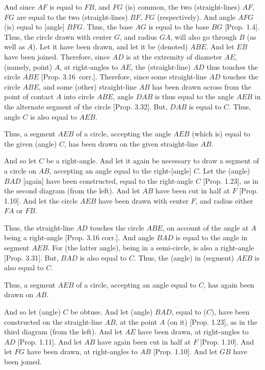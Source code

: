\begin{Parallel}{}{}
{And since $AF$ is equal to $FB$, and $FG$ (is) common, the two (straight-lines)
$AF$, $FG$ are equal to the two (straight-lines) $BF$, $FG$ (respectively). And
angle $AFG$ (is) equal to [angle] $BFG$. Thus, the base $AG$ is equal to the
base $BG$ [Prop. 1.4]. Thus, the circle drawn with center $G$, and radius $GA$, will also go through $B$ (as well as $A$). Let it have been drawn, and let it be (denoted) $ABE$. And let $EB$ have been joined. Therefore, since $AD$ is at the extremity
of diameter $AE$,  (namely, point) $A$,  at right-angles to $AE$, the (straight-line)
$AD$ thus touches the circle $ABE$ [Prop. 3.16~corr.]. Therefore,
since some straight-line $AD$ touches the circle $ABE$, and some (other)
straight-line $AB$ has been drawn across from the point of contact $A$ into circle
$ABE$, angle $DAB$ is thus equal to the angle $AEB$ in the alternate segment of the
circle [Prop. 3.32]. But, $DAB$ is equal to $C$. Thus,
angle $C$ is also equal to $AEB$.

Thus, a segment $AEB$ of a circle, accepting the angle $AEB$ (which is) equal to the
given (angle) $C$, has been drawn on the given straight-line $AB$.

And so let $C$ be a right-angle. And let it again be necessary to draw  a segment
of a circle on $AB$, accepting an angle equal to the right-[angle] $C$. Let the (angle)
$BAD$ [again] have been constructed, equal to the right-angle $C$ [Prop. 1.23], as in the second diagram (from the left). And let $AB$ have
been cut in half at $F$ [Prop. 1.10]. And let the circle $AEB$ have been
drawn with center $F$, and radius either  $FA$ or $FB$.

Thus, the straight-line $AD$ touches the circle $ABE$, on account of the angle at $A$ being a right-angle [Prop. 3.16 corr.]. And angle $BAD$ is equal
to the angle in segment $AEB$. For (the latter angle), being in a semi-circle, is also a right-angle [Prop. 3.31]. But,  $BAD$ is also equal to $C$. Thus, the (angle) in (segment) $AEB$ is also equal to $C$.

Thus, a segment $AEB$ of a circle, accepting an angle equal to $C$, has again been
drawn on $AB$.

And so let (angle) $C$ be obtuse. And let (angle) $BAD$, equal
to ($C$), have been constructed  on the straight-line $AB$, at the point $A$ 
(on it) [Prop. 1.23], as in the third diagram (from the left). And let $AE$ have been
drawn, at right-angles to $AD$ [Prop. 1.11]. And let $AB$ have again been
cut in half at $F$ [Prop. 1.10]. And let $FG$ have been drawn,
at right-angles to $AB$ [Prop. 1.10]. And let $GB$ 
have been joined.

}
\end{Parallel}

